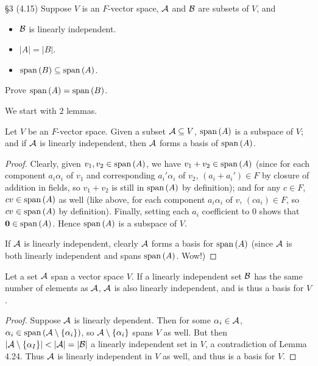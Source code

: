 \documentclass{homework}
\begin{document}
\begin{problem}{\S 3}
  (4.15) Suppose $V$ is an $F$-vector space, $\mathcal{A}$ and $\mathcal{B}$ are subsets of $V$, and
  \begin{itemize}
    \item $\mathcal{B}$ is linearly independent.
    \item $\left| A \right| =\left| B \right| $.
    \item $\operatorname{span}{(B)}\subseteq \operatorname{span}{(A)}$.
  \end{itemize}
  Prove $\operatorname{span}{(A)}=\operatorname{span}{(B)}$.
\end{problem}

\begin{solution}
  We start with $2$ lemmas.

  \begin{lemma}{}
    Let $V$ be an $F$-vector space. Given a subset $\mathcal{A}\subseteq V$, $\operatorname{span}{(A)}$ is a subspace
    of $V$; and if $\mathcal{A}$ is linearly independent, then $\mathcal{A}$ forms a basis of $\operatorname{span}{(A)}$.
  \end{lemma}
  \begin{proof}[Proof]
    Clearly, given $v_1,v_2\in \operatorname{span}{(A)}$, we have $v_1+v_2\in \operatorname{span}{(A)}$ (since for each
    component $a_i\alpha_i$ of $v_1$ and corresponding $a_i'\alpha_i$ of $v_2$, $(a_i+a_i')\in F$ by
    closure of addition in fields, so $v_1+v_2$ is still in $\operatorname{span}{(A)}$ by definition); and for any
    $c\in F$, $cv\in \operatorname{span}{(A)}$ as well (like above, for each component $a_i\alpha_i$ of $v$,
    $(ca_i)\in F$, so $cv\in \operatorname{span}{(A)}$ by definition). Finally, setting each $a_i$ coefficient
    to $0$ shows that $\textbf{0}\in \operatorname{span}{(A)}$. Hence $\operatorname{span}{(A)}$ is a subspace of $V$.

    If $\mathcal{A}$ is linearly independent, clearly $\mathcal{A}$ forms a basis for $\operatorname{span}{(A)}$ (since
    $\mathcal{A}$ is both linearly independent and spans $\operatorname{span}{(A)}$. Wow!)
  \end{proof}
  
  \begin{lemma}{}
    Let a set $\mathcal{A}$ span a vector space $V$. If a linearly independent set $\mathcal{B}$ has the same
    number of elements as $\mathcal{A}$, $\mathcal{A}$ is also linearly independent, and is thus a basis for
    $V$.
  \end{lemma}
  \begin{proof}[Proof]
    Suppose $\mathcal{A}$ is linearly dependent. Then for some $\alpha_i\in \mathcal{A}$, $\alpha_i\in
    \operatorname{span}{(\mathcal{A}\setminus \{ \alpha_i \})}$, so $\mathcal{A}\setminus \{ \alpha_i \}$ spans $V$ as well.
    But then $\left| \mathcal{A}\setminus \{ \alpha_I \} \right| <\left| \mathcal{A} \right| =\left| \mathcal{B}
    \right| $ a linearly independent set in $V$, a contradiction of Lemma 4.24. Thus $\mathcal{A}$ is
    linearly independent in $V$ as well, and thus is a basis for $V$.
  \end{proof}
  

\end{solution}
\end{document}

